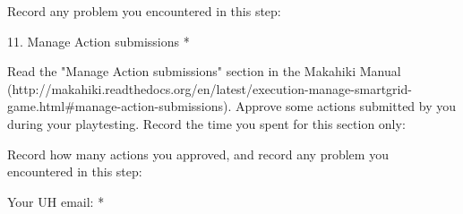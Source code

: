 Record any problem you encountered in this step:

11. Manage Action submissions *

Read the "Manage Action submissions" section in the Makahiki Manual (http://makahiki.readthedocs.org/en/latest/execution-manage-smartgrid-game.html\#manage-action-submissions). Approve some actions submitted by you during your playtesting. Record the time you spent for this section only:

Record how many actions you approved, and record any problem you encountered in this step:

Your UH email: *
